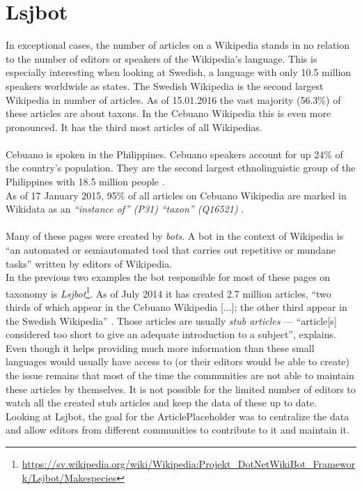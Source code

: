 \section{Lsjbot}
In exceptional cases, the number of articles on a Wikipedia stands in no relation to the number of editors or speakers of the Wikipedia's language. This is especially interesting when looking at Swedish, a language with only 10.5 million speakers worldwide as \citet{nlpd:01} states. The Swedish Wikipedia is the second largest Wikipedia in number of articles. As of 15.01.2016 the vast majority (56.3\%) of these articles are about taxons.
In the Cebuano Wikipedia this is even more pronounced. It has the third most articles of all Wikipedias. \citep{wiki:07} \\
\\
Cebuano is spoken in the Philippines. Cebuano speakers account for up 24\% of the country's population. \citep{cebuano:01} They are the second largest ethnolinguistic group of the Philippines with 18.5 million people \citep{cebuano:02}. \\
As of 17 January 2015, 95\% of all articles on Cebuano Wikipedia are marked in Wikidata as an \textit{``instance of'' (P31)} \textit{``taxon'' (Q16521)} \citep{wiki:07}. \\
\\
Many of these pages were created by \textit{bots}. A bot in the context of Wikipedia is ``an automated or semiautomated tool that carries out repetitive or mundane tasks'' \citep{wiki:08} written by editors of Wikipedia. \\
In the previous two examples the bot responsible for most of these pages on taxonomy is \textit{Lsjbot}\footnote{\url{https://sv.wikipedia.org/wiki/Wikipedia:Projekt_DotNetWikiBot_Framework/Lsjbot/Makespecies}}. As of July 2014 it has created 2.7 million articles, ``two thirds of which appear in the Cebuano Wikipedia [...]; the other third appear in the Swedish Wikipedia'' \citep{wiki:09}. Those articles are usually \textit{stub articles} --- ``article[s] considered too short to give an adequate introduction to a subject'', \citet{stubs} explains. \\
Even though it helps providing much more information than these small languages would usually have access to (or their editors would be able to create) the issue remains that most of the time the communities are not able to maintain these articles by themselves. It is not possible for the limited number of editors to watch all the created stub articles and keep the data of these up to date. \\
Looking at Lsjbot, the goal for the ArticlePlaceholder was to centralize the data and allow editors from different communities to contribute to it and maintain it.

